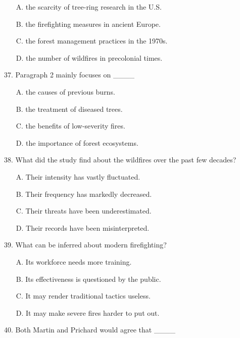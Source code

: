 \documentclass[UTF8,11pt]{ctexart}
\begin{document}
\begin{itemize}[leftmargin=2em,itemsep=.2em,topsep=.4em]\item[A.] the scarcity of tree-ring research in the U.S.
\item[B.] the firefighting measures in ancient Europe.
\item[C.] the forest management practices in the 1970s.
\item[D.] the number of wildfires in precolonial times.
\end{itemize}

37. Paragraph 2 mainly focuses on \_\_\_\_


\begin{itemize}[leftmargin=2em,itemsep=.2em,topsep=.4em]\item[A.] the causes of previous burns.
\item[B.] the treatment of diseased trees.
\item[C.] the benefits of low-severity fires.
\item[D.] the importance of forest ecosystems.
\end{itemize}

38. What did the study find about the wildfires over the past few decades?


\begin{itemize}[leftmargin=2em,itemsep=.2em,topsep=.4em]\item[A.] Their intensity has vastly fluctuated.
\item[B.] Their frequency has markedly decreased.
\item[C.] Their threats have been underestimated.
\item[D.] Their records have been misinterpreted.
\end{itemize}

39. What can be inferred about modern firefighting?


\begin{itemize}[leftmargin=2em,itemsep=.2em,topsep=.4em]\item[A.] Its workforce needs more training.
\item[B.] Its effectiveness is questioned by the public.
\item[C.] It may render traditional tactics useless.
\item[D.] It may make severe fires harder to put out.
\end{itemize}

40. Both Martin and Prichard would agree that \_\_\_\_
\end{document}
